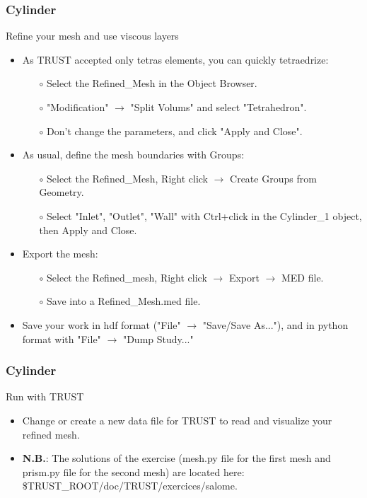 \documentclass[10pt]{beamer}
\begin{document}
\begin{frame}
\frametitle{Cylinder}
\begin{block}{Refine your mesh and use viscous layers}

\begin{itemize}
\item As TRUST accepted only tetras elements, you can quickly tetraedrize:
    \begin{itemize}
    \item [$\circ$] Select the Refined\_Mesh in the Object Browser.
    \item [$\circ$] "Modification" $\rightarrow$ "Split Volums" and select "Tetrahedron".
    \item [$\circ$] Don't change the parameters, and click "Apply and Close".
    \end{itemize}

\item As usual, define the mesh boundaries with Groups:
    \begin{itemize}
    \item [$\circ$] Select the Refined\_Mesh, Right click $\rightarrow$ Create Groups from Geometry.
    \item [$\circ$] Select "Inlet", "Outlet", "Wall" with Ctrl+click in the Cylinder\_1 object, then Apply and Close.
    \end{itemize}

\item Export the mesh:
    \begin{itemize}
    \item [$\circ$] Select the Refined\_mesh, Right click $\rightarrow$ Export $\rightarrow$ MED file.
    \item [$\circ$] Save into a Refined\_Mesh.med file.
    \end{itemize}

\item Save your work in hdf format ("File" $\rightarrow$ "Save/Save As..."), and in python format with "File" $\rightarrow$ "Dump Study..."
\end{itemize}

\end{block}
\end{frame}
\begin{frame}
\frametitle{Cylinder}
\begin{block}{Run with TRUST}

\begin{itemize}
\item Change or create a new data file for TRUST to read and visualize your refined mesh.

\item \textbf{N.B.}: The solutions of the exercise (mesh.py file for the first mesh and prism.py file for the second mesh) are located here: \$TRUST\_ROOT/doc/TRUST/exercices/salome.
\end{itemize}

\end{block}
\end{frame}
\end{document}
